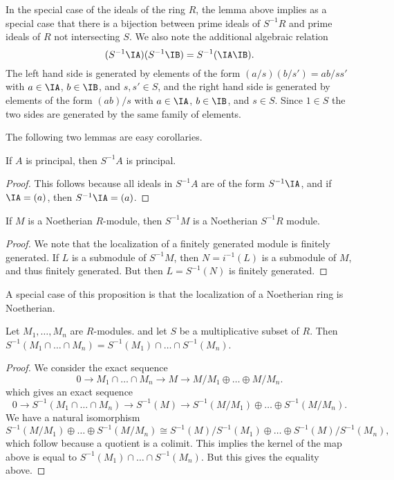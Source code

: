 \begin{remark}
    In the special case of the ideals of the ring $R$, the lemma above implies as a special case that there is a bijection between prime ideals of $S^{-1}R$ and prime ideals of $R$ not intersecting $S$. We also note the additional algebraic relation
    \[ (S^{-1} \IA) (S^{-1} \IB) = S^{-1}(\IA \IB). \]
    The left hand side is generated by elements of the form $(a/s)(b/s') = ab/ss'$ with $a \in \IA$, $b \in \IB$, and $s,s' \in S$, and the right hand side is generated by elements of the form $(ab)/s$ with $a \in \IA$, $b \in \IB$, and $s \in S$. Since $1 \in S$ the two sides are generated by the same family of elements.
\end{remark}

The following two lemmas are easy corollaries.


\begin{prop}
    If $A$ is principal, then $S^{-1}A$ is principal.
\end{prop}
\begin{proof}
    This follows because all ideals in $S^{-1} A$ are of the form $S^{-1} \IA$, and if $\IA = (a)$, then $S^{-1}\IA = (a)$.
\end{proof}

\begin{prop}
    If $M$ is a Noetherian $R$-module, then $S^{-1}M$ is a Noetherian $S^{-1}R$ module.
\end{prop}
\begin{proof}
    We note that the localization of a finitely generated module is finitely generated. If $L$ is a submodule of $S^{-1}M$, then $N = i^{-1}(L)$ is a submodule of $M$, and thus finitely generated. But then $L = S^{-1}(N)$ is finitely generated.
\end{proof}

\begin{remark}
    A special case of this proposition is that the localization of a Noetherian ring is Noetherian.
\end{remark}

\begin{prop}
    Let $M_1,\dots, M_n$ are $R$-modules. and let $S$ be a multiplicative subset of $R$. Then $S^{-1}(M_1 \cap \dots \cap M_n) = S^{-1}(M_1) \cap \dots \cap S^{-1}(M_n)$.
\end{prop}
\begin{proof}
    We consider the exact sequence
    \[ 0 \to M_1 \cap \dots \cap M_n \to M \to M/M_1 \oplus \dots \oplus M/M_n. \]
    which gives an exact sequence
    \[ 0 \to S^{-1}(M_1 \cap \dots \cap M_n) \to S^{-1}(M) \to S^{-1}(M/M_1) \oplus \dots \oplus S^{-1}(M/M_n). \]
    We have a natural isomorphism
    \[ S^{-1}(M/M_1) \oplus \dots \oplus S^{-1}(M/M_n) \cong S^{-1}(M)/S^{-1}(M_1) \oplus \dots \oplus S^{-1}(M)/S^{-1}(M_n), \]
    which follow because a quotient is a colimit. This implies the kernel of the map above is equal to $S^{-1}(M_1) \cap \dots \cap S^{-1}(M_n)$. But this gives the equality above.
\end{proof}

